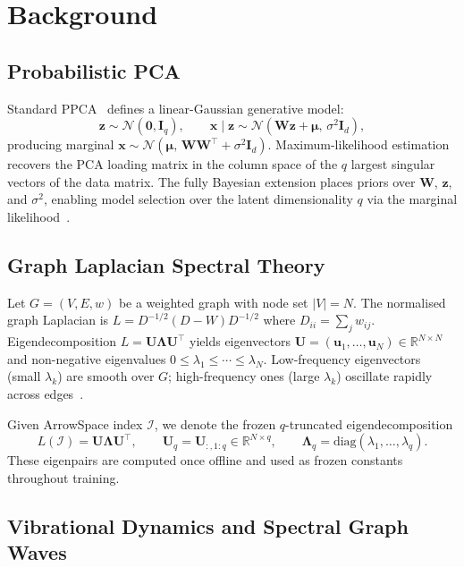 \documentclass[11pt,a4paper]{article}
\newcommand{\R}{\mathbb{R}}
\newcommand{\N}{\mathcal{N}}
\newcommand{\I}{\mathcal{I}}
\newcommand{\diag}{\mathrm{diag}}
\newcommand{\bLambda}{\bm{\Lambda}}
\newcommand{\bU}{\bm{U}}
\newcommand{\bW}{\bm{W}}
\newcommand{\bz}{\bm{z}}
\newcommand{\bmu}{\bm{\mu}}
\newcommand{\bx}{\bm{x}}
\begin{document}
\section{Background}
\label{sec:background}

\subsection{Probabilistic PCA}

Standard PPCA~\citep{tipping1999ppca} defines a linear-Gaussian generative
model:
\begin{equation}
  \bz \sim \N(\mathbf{0}, \bm{I}_q), \qquad
  \bx \mid \bz \sim \N(\bW\bz + \bmu,\, \sigma^2 \bm{I}_d),
  \label{eq:ppca}
\end{equation}
producing marginal $\bx\sim\N(\bmu,\,\bW\bW^\top+\sigma^2\bm{I}_d)$.
Maximum-likelihood estimation recovers the PCA loading matrix in the column
space of the $q$ largest singular vectors of the data matrix.  The fully
Bayesian extension places priors over $\bW$, $\bz$, and $\sigma^2$, enabling
model selection over the latent dimensionality $q$ via the marginal
likelihood~\citep{minka2001pca}.

\subsection{Graph Laplacian Spectral Theory}

Let $G=(V,E,w)$ be a weighted graph with node set $|V|=N$.  The normalised
graph Laplacian is $L = D^{-1/2}(D-W)D^{-1/2}$ where $D_{ii}=\sum_j w_{ij}$.
Eigendecomposition $L = \bU\bLambda\bU^\top$ yields eigenvectors
$\bU=(\mathbf{u}_1,\dots,\mathbf{u}_N)\in\R^{N\times N}$ and non-negative
eigenvalues $0\le\lambda_1\le\cdots\le\lambda_N$.  Low-frequency eigenvectors
(small $\lambda_k$) are smooth over $G$; high-frequency ones (large $\lambda_k$)
oscillate rapidly across edges~\citep{chung1997spectral}.

Given ArrowSpace index $\I$, we denote the frozen $q$-truncated eigendecomposition
\begin{equation}
  L(\I) = \bU\bLambda\bU^\top,
  \qquad
  \bU_q = \bU_{:,1:q}\in\R^{N\times q},
  \qquad
  \bLambda_q = \diag(\lambda_1,\dots,\lambda_q).
  \label{eq:eig}
\end{equation}
These eigenpairs are computed once offline and used as frozen constants
throughout training.

\subsection{Vibrational Dynamics and Spectral Graph Waves}
\label{sec:vibration}
\end{document}
